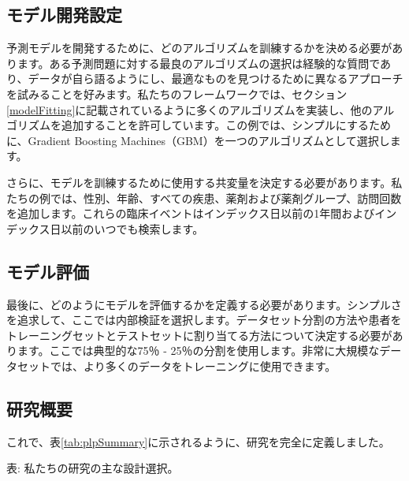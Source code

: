 \documentclass[
  11pt]{book}
\theoremstyle{definition}
\theoremstyle{definition}
\theoremstyle{definition}
\theoremstyle{definition}
\theoremstyle{remark}
\begin{document}
\subsection{モデル開発設定}\label{ux30e2ux30c7ux30ebux958bux767aux8a2dux5b9a}

予測モデルを開発するために、どのアルゴリズムを訓練するかを決める必要があります。ある予測問題に対する最良のアルゴリズムの選択は経験的な質問であり、データが自ら語るようにし、最適なものを見つけるために異なるアプローチを試みることを好みます。私たちのフレームワークでは、セクション\ref{modelFitting}に記載されているように多くのアルゴリズムを実装し、他のアルゴリズムを追加することを許可しています。この例では、シンプルにするために、Gradient Boosting Machines（GBM）を一つのアルゴリズムとして選択します。

さらに、モデルを訓練するために使用する共変量を決定する必要があります。私たちの例では、性別、年齢、すべての疾患、薬剤および薬剤グループ、訪問回数を追加します。これらの臨床イベントはインデックス日以前の1年間およびインデックス日以前のいつでも検索します。

\subsection{モデル評価}\label{ux30e2ux30c7ux30ebux8a55ux4fa1}

最後に、どのようにモデルを評価するかを定義する必要があります。シンプルさを追求して、ここでは内部検証を選択します。データセット分割の方法や患者をトレーニングセットとテストセットに割り当てる方法について決定する必要があります。ここでは典型的な75％ - 25％の分割を使用します。非常に大規模なデータセットでは、より多くのデータをトレーニングに使用できます。

\subsection{研究概要}\label{ux7814ux7a76ux6982ux8981}

これで、表\ref{tab:plpSummary}に示されるように、研究を完全に定義しました。

表: \label{tab:plpSummary} 私たちの研究の主な設計選択。
\end{document}
